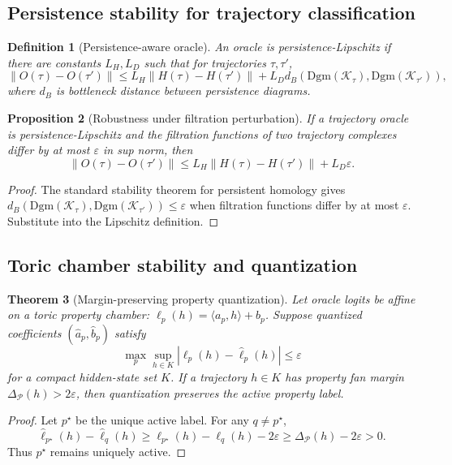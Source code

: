 \documentclass[11pt]{article}
\newtheorem{theorem}{Theorem}[section]
\newtheorem{proposition}[theorem]{Proposition}
\newtheorem{definition}[theorem]{Definition}
\newcommand{\calK}{\mathcal{K}}
\newcommand{\calP}{\mathcal{P}}
\newcommand{\eps}{\varepsilon}
\numberwithin{equation}{section}
\begin{document}
\subsection{Persistence stability for trajectory classification}
\begin{definition}[Persistence-aware oracle]
An oracle is persistence-Lipschitz if there are constants $L_H,L_D$ such that for trajectories $\tau,\tau'$,
\begin{equation}
\|O(\tau)-O(\tau')\|\le L_H\|H(\tau)-H(\tau')\|+L_D d_B(\mathrm{Dgm}(\calK_\tau),\mathrm{Dgm}(\calK_{\tau'})),
\end{equation}
where $d_B$ is bottleneck distance between persistence diagrams.
\end{definition}

\begin{proposition}[Robustness under filtration perturbation]
If a trajectory oracle is persistence-Lipschitz and the filtration functions of two trajectory complexes differ by at most $\eps$ in sup norm, then
\begin{equation}
\|O(\tau)-O(\tau')\|\le L_H\|H(\tau)-H(\tau')\|+L_D\eps.
\end{equation}
\end{proposition}
\begin{proof}
The standard stability theorem for persistent homology gives $d_B(\mathrm{Dgm}(\calK_\tau),\mathrm{Dgm}(\calK_{\tau'}))\le\eps$ when filtration functions differ by at most $\eps$. Substitute into the Lipschitz definition.
\end{proof}

\subsection{Toric chamber stability and quantization}
\begin{theorem}[Margin-preserving property quantization]
Let oracle logits be affine on a toric property chamber: $\ell_p(h)=\langle a_p,h\rangle+b_p$. Suppose quantized coefficients $(\hat a_p,\hat b_p)$ satisfy
\begin{equation}
\max_p\sup_{h\in K}|\ell_p(h)-\hat\ell_p(h)|\le\eps
\end{equation}
for a compact hidden-state set $K$. If a trajectory $h\in K$ has property fan margin $\Delta_{\calP}(h)>2\eps$, then quantization preserves the active property label.
\end{theorem}
\begin{proof}
Let $p^\star$ be the unique active label. For any $q\ne p^\star$,
\begin{equation}
\hat\ell_{p^\star}(h)-\hat\ell_q(h)\ge \ell_{p^\star}(h)-\ell_q(h)-2\eps\ge \Delta_{\calP}(h)-2\eps>0.
\end{equation}
Thus $p^\star$ remains uniquely active.
\end{proof}
\end{document}
